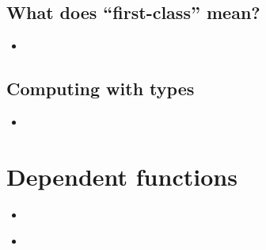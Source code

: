 \documentclass{beamer}
\begin{document}
\subsection{What does ``first-class'' mean?}


\begin{frame}{}
	\begin{itemize}
		\item 
	\end{itemize}
	\end{frame}

\subsection{Computing with types}


\begin{frame}{}
	\begin{itemize}
		\item 
	\end{itemize}
	\end{frame}

\section{Dependent functions}

\begin{frame}{}
	\begin{itemize}
		\item 
	\end{itemize}
	\end{frame}


\begin{frame}{}
	\begin{itemize}
		\item 
	\end{itemize}
	\end{frame}
\end{document}
